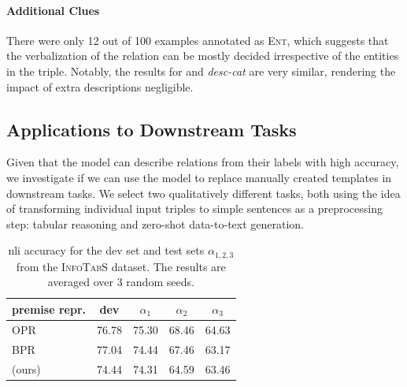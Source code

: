 \paragraph{Additional Clues} There were only 12 out of 100 examples annotated as \textsc{Ent}, which suggests that the verbalization of the relation can be mostly decided irrespective of the entities in the triple. Notably, the results for \BARTr{} and \textit{desc-cat} are very similar, rendering the impact of extra descriptions negligible.


\subsection{Applications to Downstream Tasks}
\label{sec:rel2text:downstream}
Given that the \BARTr{} model can describe relations from their labels with high accuracy, we investigate if we can use the model to replace manually created templates in downstream tasks. We select two qualitatively different tasks, both using the idea of transforming individual input triples to simple sentences as a preprocessing step: tabular reasoning and zero-shot data-to-text generation.


\begin{table}[t]\centering
    \small
    \setlength{\tabcolsep}{4pt}
    \begin{tabular}{lcccc}\toprule
        \textbf{premise repr.}              & \textbf{dev} & $\alpha_1$ & $\alpha_2$ & $\alpha_3$ \\\midrule
        OPR \cite{gupta2020infotabs}        & 76.78        & 75.30      & 68.46      & 64.63      \\
        BPR \cite{neeraja2021incorporating} & 77.04        & 74.44      & 67.46      & 63.17      \\
        \BARTr{} (ours)                     & 74.44        & 74.31      & 64.59      & 63.46      \\
        \bottomrule
    \end{tabular}
    \caption[NLI accuracy on the \textsc{InfoTabS} dataset.]{\ac{nli} accuracy for the dev set and test sets  $\alpha_{1,2,3}$ from the \textsc{InfoTabS} dataset. The results are averaged over 3 random seeds.}
    \label{tab:rel2text:nli}
\end{table}


